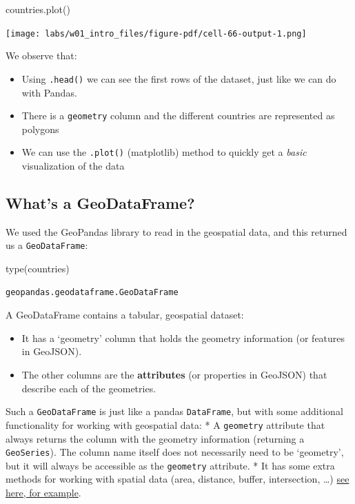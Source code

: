 \documentclass[
  letterpaper,
  DIV=11,
  numbers=noendperiod]{scrreprt}
\newenvironment{Shaded}{\begin{snugshade}}{\end{snugshade}}
\newcommand{\BuiltInTok}[1]{\textcolor[rgb]{0.00,0.23,0.31}{#1}}
\newcommand{\NormalTok}[1]{\textcolor[rgb]{0.00,0.23,0.31}{#1}}
\providecommand{\tightlist}{%
  \setlength{\itemsep}{0pt}\setlength{\parskip}{0pt}}\usepackage{longtable,booktabs,array}
\begin{document}
\begin{Shaded}
\begin{Highlighting}[]
\NormalTok{countries.plot()}
\end{Highlighting}
\end{Shaded}

\texttt{[image: labs/w01\_intro\_files/figure-pdf/cell-66-output-1.png]}

We observe that:

\begin{itemize}
\tightlist
\item
  Using \texttt{.head()} we can see the first rows of the dataset, just
  like we can do with Pandas.
\item
  There is a \texttt{geometry} column and the different countries are
  represented as polygons
\item
  We can use the \texttt{.plot()} (matplotlib) method to quickly get a
  \emph{basic} visualization of the data
\end{itemize}

\subsection{What's a GeoDataFrame?}\label{whats-a-geodataframe}

We used the GeoPandas library to read in the geospatial data, and this
returned us a \texttt{GeoDataFrame}:

\begin{Shaded}
\begin{Highlighting}[]
\BuiltInTok{type}\NormalTok{(countries)}
\end{Highlighting}
\end{Shaded}

\begin{verbatim}
geopandas.geodataframe.GeoDataFrame
\end{verbatim}

A GeoDataFrame contains a tabular, geospatial dataset:

\begin{itemize}
\tightlist
\item
  It has a `geometry' column that holds the geometry information (or
  features in GeoJSON).
\item
  The other columns are the \textbf{attributes} (or properties in
  GeoJSON) that describe each of the geometries.
\end{itemize}

Such a \texttt{GeoDataFrame} is just like a pandas \texttt{DataFrame},
but with some additional functionality for working with geospatial data:
* A \texttt{geometry} attribute that always returns the column with the
geometry information (returning a \texttt{GeoSeries}). The column name
itself does not necessarily need to be `geometry', but it will always be
accessible as the \texttt{geometry} attribute. * It has some extra
methods for working with spatial data (area, distance, buffer,
intersection, \ldots)
\href{https://github.com/jorisvandenbossche/geopandas-tutorial/blob/main/04-spatial-operations-overlays.ipynb}{see
here, for example}.
\end{document}
